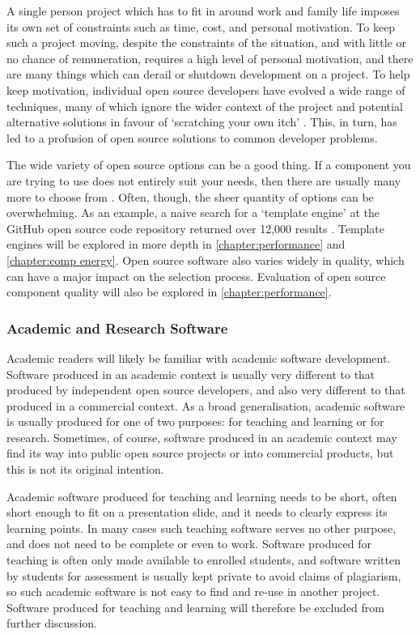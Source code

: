 A single person project which has to fit in around work and family life imposes its own set of constraints such as time, cost, and personal motivation. To keep such a project moving, despite the constraints of the situation, and with little or no chance of remuneration, requires a high level of personal motivation, and there are many things which can derail or shutdown development on a project. To help keep motivation, individual open source developers have evolved a wide range of techniques, many of which ignore the wider context of the project and potential alternative solutions in favour of `scratching your own itch' \citep{Raymond1999} \citep{Raymond2010}. This, in turn, has led to a profusion of open source solutions to common developer problems.

The wide variety of open source options can be a good thing. If a component you are trying to use does not entirely suit your needs, then there are usually many more to choose from \citep{Raymond2010}. Often, though, the sheer quantity of options can be overwhelming. As an example, a naive search for a `template engine' at the GitHub open source code repository returned over 12,000 results \citep{GitHub2022}. Template engines will be explored in more depth in \autoref{chapter:performance} and \autoref{chapter:comp energy}. Open source software also varies widely in quality, which can have a major impact on the selection process. Evaluation of open source component quality will also be explored in \autoref{chapter:performance}.

\subsubsection{Academic and Research Software}

Academic readers will likely be familiar with academic software development. Software produced in an academic context is usually very different to that produced by independent open source developers, and also very different to that produced in a commercial context. As a broad generalisation, academic software is usually produced for one of two purposes: for teaching and learning or for research. Sometimes, of course, software produced in an academic context may find its way into public open source projects or into commercial products, but this is not its original intention.

Academic software produced for teaching and learning needs to be short, often short enough to fit on a presentation slide, and it needs to clearly express its learning points. In many cases such teaching software serves no other purpose, and does not need to be complete or even to work. Software produced for teaching is often only made available to enrolled students, and software written by students for assessment is usually kept private to avoid claims of plagiarism, so such academic software is not easy to find and re-use in another project. Software produced for teaching and learning will therefore be excluded from further discussion.

